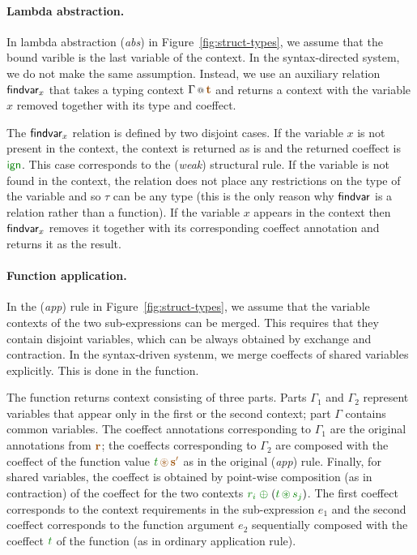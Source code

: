 \paragraph{Lambda abstraction.}
In lambda abstraction (\emph{abs}) in Figure~\ref{fig:struct-types}, we assume that the bound
varible is the last variable of the context. In the syntax-directed system, we do not make the
same assumption. Instead, we use an auxiliary relation $\textnormal{\sffamily findvar}_x$ that takes a typing
context $\coctx{\Gamma}{\aclrd{\textbf{t}}}$ and returns a context with the variable $x$ removed
together with its type and coeffect.

The $\textnormal{\sffamily findvar}_x$ relation is defined by two disjoint cases. If the variable $x$ is not
present in the context, the context is returned as is and the returned coeffect is $\czero$.
This case corresponds to the (\emph{weak}) structural rule. If the variable is not found in the
context, the relation does not place any restrictions on the type of the variable and so $\tau$
can be any type (this is the only reason why $\textnormal{\sffamily findvar}$ is a relation rather than a function).
If the variable $x$ appears in the context then $\textnormal{\sffamily findvar}_x$ removes it together with its
corresponding coeffect annotation and returns it as the result.

\paragraph{Function application.} In the (\emph{app}) rule in Figure~\ref{fig:struct-types}, we
assume that the variable contexts of the two sub-expressions can be merged. This requires that they
contain disjoint variables, which can be always obtained by exchange and contraction. In the
syntax-driven systenm, we merge coeffects of shared variables explicitly. This is done in the
 function.

The  function returns context consisting of three parts. Parts $\Gamma_1$
and $\Gamma_2$ represent variables that appear only in the first or the second context; part
$\Gamma$ contains common variables. The coeffect annotations corresponding to $\Gamma_1$ are
the original annotations from $\aclrd{\textbf{r}}$; the coeffects corresponding to $\Gamma_2$
are composed with the coeffect of the function value $\cclrd{t} \,\aseq\, \aclrd{\textbf{s}'}$
as in the original (\emph{app}) rule. Finally, for shared variables, the coeffect is
obtained by point-wise composition (as in contraction) of the coeffect for the two contexts
$\cclrd{r_i} \;\cpar\; (\cclrd{t} \,\cseq\, \cclrd{s_j})$. The first coeffect corresponds to the
context requirements in the sub-expression $e_1$ and the second coeffect corresponds to the
function argument $e_2$ sequentially composed with the coeffect $\cclrd{t}$ of the function
(as in ordinary application rule).


